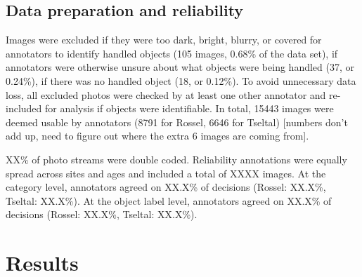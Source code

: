 \documentclass[10pt, letterpaper]{article}
\begin{document}
\hypertarget{data-preparation-and-reliability}{%
\subsection{Data preparation and
reliability}\label{data-preparation-and-reliability}}

Images were excluded if they were too dark, bright, blurry, or covered
for annotators to identify handled objects (105 images, 0.68\% of the
data set), if annotators were otherwise unsure about what objects were
being handled (37, or 0.24\%), if there was no handled object (18, or
0.12\%). To avoid unnecessary data loss, all excluded photos were
checked by at least one other annotator and re-included for analysis if
objects were identifiable. In total, 15443 images were deemed usable by
annotators (8791 for Rossel, 6646 for Tseltal) {[}numbers don't add up,
need to figure out where the extra 6 images are coming from{]}.

XX\% of photo streams were double coded. Reliability annotations were
equally spread across sites and ages and included a total of XXXX
images. At the category level, annotators agreed on XX.X\% of decisions
(Rossel: XX.X\%, Tseltal: XX.X\%). At the object label level, annotators
agreed on XX.X\% of decisions (Rossel: XX.X\%, Tseltal: XX.X\%).

\begin{table}[!ht]
\centering
{}
\caption{Non-study-related objects handled by the most children across categories and sites.} 
\label{tab:top-objects}
\end{table}

\hypertarget{results}{%
\section{Results}\label{results}}
\end{document}
